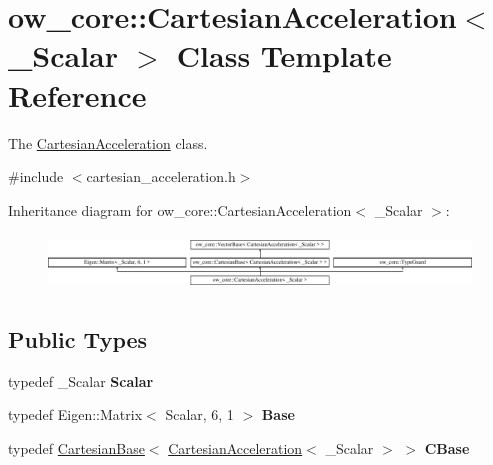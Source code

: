 \hypertarget{classow__core_1_1CartesianAcceleration}{}\section{ow\+\_\+core\+:\+:Cartesian\+Acceleration$<$ \+\_\+\+Scalar $>$ Class Template Reference}
\label{classow__core_1_1CartesianAcceleration}


The \hyperlink{classow__core_1_1CartesianAcceleration}{Cartesian\+Acceleration} class.  




{\ttfamily \#include $<$cartesian\+\_\+acceleration.\+h$>$}

Inheritance diagram for ow\+\_\+core\+:\+:Cartesian\+Acceleration$<$ \+\_\+\+Scalar $>$\+:\begin{figure}[H]
\begin{center}
\leavevmode
\includegraphics[height=1.493333cm]{df/d67/classow__core_1_1CartesianAcceleration}
\end{center}
\end{figure}
\subsection*{Public Types}
\begin{DoxyCompactItemize}
\item 
typedef \+\_\+\+Scalar {\bfseries Scalar}\hypertarget{classow__core_1_1CartesianAcceleration_aa6c9e5a1a1c66107763255ebd637926d}{}\label{classow__core_1_1CartesianAcceleration_aa6c9e5a1a1c66107763255ebd637926d}

\item 
typedef Eigen\+::\+Matrix$<$ Scalar, 6, 1 $>$ {\bfseries Base}\hypertarget{classow__core_1_1CartesianAcceleration_af0e02dd04a0364641ca0b75b9e9e74de}{}\label{classow__core_1_1CartesianAcceleration_af0e02dd04a0364641ca0b75b9e9e74de}

\item 
typedef \hyperlink{classow__core_1_1CartesianBase}{Cartesian\+Base}$<$ \hyperlink{classow__core_1_1CartesianAcceleration}{Cartesian\+Acceleration}$<$ \+\_\+\+Scalar $>$ $>$ {\bfseries C\+Base}\hypertarget{classow__core_1_1CartesianAcceleration_aa436f4398ed42687ed55de07d0dffa33}{}\label{classow__core_1_1CartesianAcceleration_aa436f4398ed42687ed55de07d0dffa33}

\end{DoxyCompactItemize}
